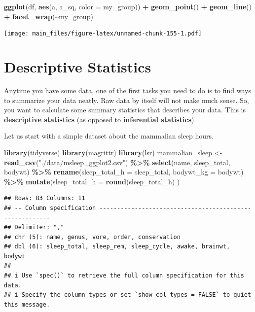 \documentclass[
]{book}
\newenvironment{Shaded}{\begin{snugshade}}{\end{snugshade}}
\newcommand{\AttributeTok}[1]{\textcolor[rgb]{0.13,0.29,0.53}{#1}}
\newcommand{\FunctionTok}[1]{\textcolor[rgb]{0.13,0.29,0.53}{\textbf{#1}}}
\newcommand{\NormalTok}[1]{#1}
\newcommand{\OtherTok}[1]{\textcolor[rgb]{0.56,0.35,0.01}{#1}}
\newcommand{\SpecialCharTok}[1]{\textcolor[rgb]{0.81,0.36,0.00}{\textbf{#1}}}
\newcommand{\StringTok}[1]{\textcolor[rgb]{0.31,0.60,0.02}{#1}}
\begin{document}
\begin{Shaded}
\begin{Highlighting}[]
\FunctionTok{ggplot}\NormalTok{(df, }\FunctionTok{aes}\NormalTok{(a, a\_sq, }\AttributeTok{color =}\NormalTok{ my\_group)) }\SpecialCharTok{+} \FunctionTok{geom\_point}\NormalTok{()  }\SpecialCharTok{+} \FunctionTok{geom\_line}\NormalTok{() }\SpecialCharTok{+} \FunctionTok{facet\_wrap}\NormalTok{(}\SpecialCharTok{\textasciitilde{}}\NormalTok{my\_group)}
\end{Highlighting}
\end{Shaded}

\texttt{[image: main\_files/figure-latex/unnamed-chunk-155-1.pdf]}

\hypertarget{descriptive-statistics}{%
\chapter{Descriptive Statistics}\label{descriptive-statistics}}

Anytime you have some data, one of the first tasks you need to do is to find ways to summarize your data neatly. Raw data by itself will not make much sense. So, you want to calculate some summary statistics that describes your data. This is \textbf{descriptive statistics} (as opposed to \textbf{inferential statistics}).

Let us start with a simple dataset about the mammalian sleep hours.

\begin{Shaded}
\begin{Highlighting}[]
\FunctionTok{library}\NormalTok{(tidyverse)}
\FunctionTok{library}\NormalTok{(magrittr)}
\FunctionTok{library}\NormalTok{(lsr)}
\NormalTok{mammalian\_sleep }\OtherTok{\textless{}{-}} 
      \FunctionTok{read\_csv}\NormalTok{(}\StringTok{"./data/msleep\_ggplot2.csv"}\NormalTok{) }\SpecialCharTok{\%\textgreater{}\%} 
      \FunctionTok{select}\NormalTok{(name, sleep\_total, bodywt) }\SpecialCharTok{\%\textgreater{}\%}
      \FunctionTok{rename}\NormalTok{(}\AttributeTok{sleep\_total\_h =}\NormalTok{ sleep\_total, }\AttributeTok{bodywt\_kg =}\NormalTok{ bodywt) }\SpecialCharTok{\%\textgreater{}\%}
      \FunctionTok{mutate}\NormalTok{(}\AttributeTok{sleep\_total\_h =} \FunctionTok{round}\NormalTok{(sleep\_total\_h) )}
\end{Highlighting}
\end{Shaded}

\begin{verbatim}
## Rows: 83 Columns: 11
## -- Column specification --------------------------------------------------------
## Delimiter: ","
## chr (5): name, genus, vore, order, conservation
## dbl (6): sleep_total, sleep_rem, sleep_cycle, awake, brainwt, bodywt
## 
## i Use `spec()` to retrieve the full column specification for this data.
## i Specify the column types or set `show_col_types = FALSE` to quiet this message.
\end{verbatim}
\end{document}
